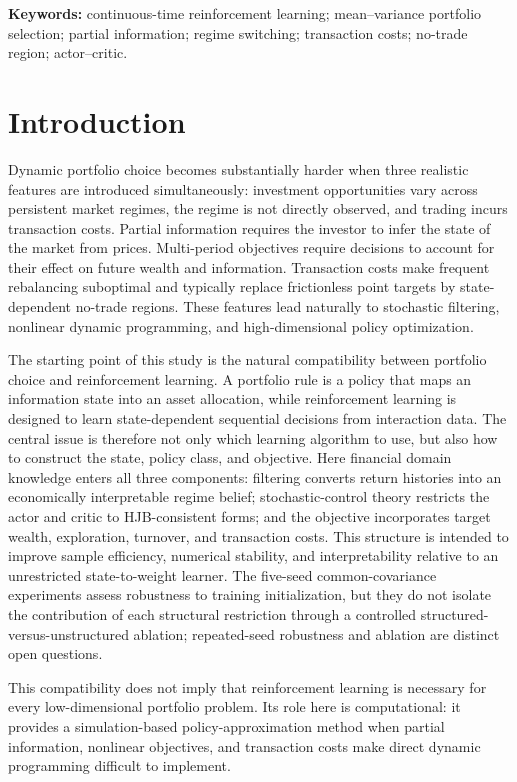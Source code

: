 \documentclass[a4paper,10pt]{article}
\begin{document}
\noindent\textbf{Keywords:} continuous-time reinforcement learning; mean--variance portfolio selection; partial information; regime switching; transaction costs; no-trade region; actor--critic.

\section{Introduction}

Dynamic portfolio choice becomes substantially harder when three realistic features are introduced simultaneously: investment opportunities vary across persistent market regimes, the regime is not directly observed, and trading incurs transaction costs. Partial information requires the investor to infer the state of the market from prices. Multi-period objectives require decisions to account for their effect on future wealth and information. Transaction costs make frequent rebalancing suboptimal and typically replace frictionless point targets by state-dependent no-trade regions. These features lead naturally to stochastic filtering, nonlinear dynamic programming, and high-dimensional policy optimization.

The starting point of this study is the natural compatibility between portfolio choice and reinforcement learning. A portfolio rule is a policy that maps an information state into an asset allocation, while reinforcement learning is designed to learn state-dependent sequential decisions from interaction data. The central issue is therefore not only which learning algorithm to use, but also how to construct the state, policy class, and objective. Here financial domain knowledge enters all three components: filtering converts return histories into an economically interpretable regime belief; stochastic-control theory restricts the actor and critic to HJB-consistent forms; and the objective incorporates target wealth, exploration, turnover, and transaction costs. This structure is intended to improve sample efficiency, numerical stability, and interpretability relative to an unrestricted state-to-weight learner. The five-seed common-covariance experiments assess robustness to training initialization, but they do not isolate the contribution of each structural restriction through a controlled structured-versus-unstructured ablation; repeated-seed robustness and ablation are distinct open questions.

This compatibility does not imply that reinforcement learning is necessary for every low-dimensional portfolio problem. Its role here is computational: it provides a simulation-based policy-approximation method when partial information, nonlinear objectives, and transaction costs make direct dynamic programming difficult to implement.
\end{document}
